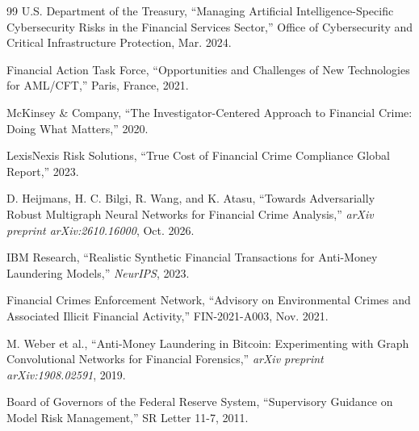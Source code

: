 \documentclass[10pt,twocolumn,a4paper]{article}
\begin{document}
\begin{thebibliography}{99}
U.S. Department of the Treasury, ``Managing Artificial Intelligence-Specific Cybersecurity Risks in the Financial Services Sector,'' Office of Cybersecurity and Critical Infrastructure Protection, Mar. 2024.

Financial Action Task Force, ``Opportunities and Challenges of New Technologies for AML/CFT,'' Paris, France, 2021.

McKinsey \& Company, ``The Investigator-Centered Approach to Financial Crime: Doing What Matters,'' 2020.

LexisNexis Risk Solutions, ``True Cost of Financial Crime Compliance Global Report,'' 2023.

D. Heijmans, H. C. Bilgi, R. Wang, and K. Atasu, ``Towards Adversarially Robust Multigraph Neural Networks for Financial Crime Analysis,'' \textit{arXiv preprint arXiv:2610.16000}, Oct. 2026.

IBM Research, ``Realistic Synthetic Financial Transactions for Anti-Money Laundering Models,'' \textit{NeurIPS}, 2023.

Financial Crimes Enforcement Network, ``Advisory on Environmental Crimes and Associated Illicit Financial Activity,'' FIN-2021-A003, Nov. 2021.

M. Weber et al., ``Anti-Money Laundering in Bitcoin: Experimenting with Graph Convolutional Networks for Financial Forensics,'' \textit{arXiv preprint arXiv:1908.02591}, 2019.

Board of Governors of the Federal Reserve System, ``Supervisory Guidance on Model Risk Management,'' SR Letter 11-7, 2011.
\end{thebibliography}
\end{document}
